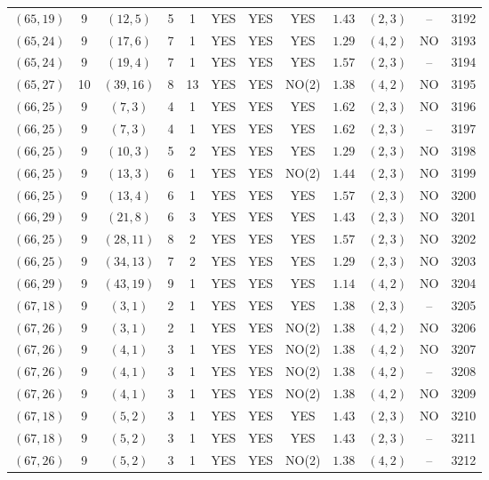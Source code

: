\begin{longtable}{|c|c|c|c|c|c|c|c|c|c|c|c|}
$(65,19)$ & 9 & $(12,5)$ & 5 & 1 & YES & YES & YES & $1.43$ & $(2,3)$ & -- & 3192\\
$(65,24)$ & 9 & $(17,6)$ & 7 & 1 & YES & YES & YES & $1.29$ & $(4,2)$ & NO & 3193\\
$(65,24)$ & 9 & $(19,4)$ & 7 & 1 & YES & YES & YES & $1.57$ & $(2,3)$ & -- & 3194\\
$(65,27)$ & 10 & $(39,16)$ & 8 & 13 & YES & YES & NO(2) & $1.38$ & $(4,2)$ & NO & 3195\\
$(66,25)$ & 9 & $(7,3)$ & 4 & 1 & YES & YES & YES & $1.62$ & $(2,3)$ & NO & 3196\\
$(66,25)$ & 9 & $(7,3)$ & 4 & 1 & YES & YES & YES & $1.62$ & $(2,3)$ & -- & 3197\\
$(66,25)$ & 9 & $(10,3)$ & 5 & 2 & YES & YES & YES & $1.29$ & $(2,3)$ & NO & 3198\\
$(66,25)$ & 9 & $(13,3)$ & 6 & 1 & YES & YES & NO(2) & $1.44$ & $(2,3)$ & NO & 3199\\
$(66,25)$ & 9 & $(13,4)$ & 6 & 1 & YES & YES & YES & $1.57$ & $(2,3)$ & NO & 3200\\
$(66,29)$ & 9 & $(21,8)$ & 6 & 3 & YES & YES & YES & $1.43$ & $(2,3)$ & NO & 3201\\
$(66,25)$ & 9 & $(28,11)$ & 8 & 2 & YES & YES & YES & $1.57$ & $(2,3)$ & NO & 3202\\
$(66,25)$ & 9 & $(34,13)$ & 7 & 2 & YES & YES & YES & $1.29$ & $(2,3)$ & NO & 3203\\
$(66,29)$ & 9 & $(43,19)$ & 9 & 1 & YES & YES & YES & $1.14$ & $(4,2)$ & NO & 3204\\
$(67,18)$ & 9 & $(3,1)$ & 2 & 1 & YES & YES & YES & $1.38$ & $(2,3)$ & -- & 3205\\
$(67,26)$ & 9 & $(3,1)$ & 2 & 1 & YES & YES & NO(2) & $1.38$ & $(4,2)$ & NO & 3206\\
$(67,26)$ & 9 & $(4,1)$ & 3 & 1 & YES & YES & NO(2) & $1.38$ & $(4,2)$ & NO & 3207\\
$(67,26)$ & 9 & $(4,1)$ & 3 & 1 & YES & YES & NO(2) & $1.38$ & $(4,2)$ & -- & 3208\\
$(67,26)$ & 9 & $(4,1)$ & 3 & 1 & YES & YES & NO(2) & $1.38$ & $(4,2)$ & NO & 3209\\
$(67,18)$ & 9 & $(5,2)$ & 3 & 1 & YES & YES & YES & $1.43$ & $(2,3)$ & NO & 3210\\
$(67,18)$ & 9 & $(5,2)$ & 3 & 1 & YES & YES & YES & $1.43$ & $(2,3)$ & -- & 3211\\
$(67,26)$ & 9 & $(5,2)$ & 3 & 1 & YES & YES & NO(2) & $1.38$ & $(4,2)$ & -- & 3212\\

\end{longtable}
